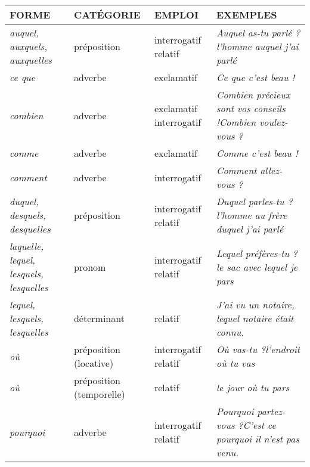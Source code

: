 \documentclass[UTF8]{report}
\begin{document}
\begin{table}[H]
\centering
\begin{tabular}{|>{\RaggedRight\arraybackslash}p{2.5cm}|l|>{\RaggedRight\arraybackslash}p{2cm}|>{\RaggedRight\arraybackslash}p{6.5cm}|}
\hline
\rowcolor{cyan!20}
\textbf{FORME} & \textbf{CATÉGORIE} & \textbf{EMPLOI} & \textbf{EXEMPLES} \\
\hline
\textit{auquel, auxquels, auxquelles} & préposition & interrogatif \newline relatif & \textit{Auquel as-tu parlé ?}\newline\textit{l'homme auquel j'ai parlé} \\
\hline
\textit{ce que} & adverbe & exclamatif & \textit{Ce que c'est beau !} \\
\hline
\textit{combien} & adverbe & exclamatif \newline interrogatif & \textit{Combien précieux sont vos conseils !}\newline\textit{Combien voulez-vous ?} \\
\hline
\textit{comme} & adverbe & exclamatif & \textit{Comme c'est beau !} \\
\hline
\textit{comment} & adverbe & interrogatif & \textit{Comment allez-vous ?} \\
\hline
\textit{duquel, desquels, desquelles} & préposition & interrogatif \newline relatif & \textit{Duquel parles-tu ?}\newline\textit{l'homme au frère duquel j'ai parlé} \\
\hline
\textit{laquelle, lequel, lesquels, lesquelles} & pronom & interrogatif \newline relatif & \textit{Lequel préfères-tu ?}\newline\textit{le sac avec lequel je pars} \\
\hline
\textit{lequel, lesquels, lesquelles} & déterminant & relatif & \textit{J'ai vu un notaire, lequel notaire était connu.} \\
\hline
\textit{où} & préposition (locative) & interrogatif \newline relatif & \textit{Où vas-tu ?}\newline\textit{l'endroit où tu vas} \\
\hline
\textit{où} & préposition (temporelle) & relatif & \textit{le jour où tu pars} \\
\hline
\textit{pourquoi} & adverbe & interrogatif \newline relatif & \textit{Pourquoi partez-vous ?}\newline\textit{C'est ce pourquoi il n'est pas venu.} \\

\end{tabular}
\end{table}
\end{document}
